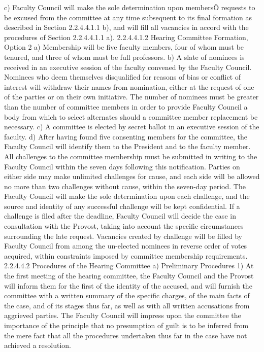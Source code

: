 \documentclass[letterpaper, 11pt]{article}
\begin{document}
	c) Faculty Council will make the sole determination upon membersÕ requests to be excused from the committee at any time subsequent to its final formation as described in Section 2.2.4.4.1.1 b), and will fill all vacancies in accord with the procedures of Section 2.2.4.4.1.1 a).
	2.2.4.4.1.2 Hearing Committee Formation, Option 2
	a) Membership will be five faculty members, four of whom must be tenured, and three of whom must be full professors.
	b) A slate of nominees is received in an executive session of the faculty convened by the Faculty Council.  Nominees who deem themselves disqualified for reasons of bias or conflict of interest will withdraw their names from nomination, either at the request of one of the parties or on their own initiative.  The number of nominees must be greater than the number of committee members in order to provide Faculty Council a body from which to select alternates should a committee member replacement be necessary.
	c) A committee is elected by secret ballot in an executive session of the faculty.
	d) After having found five consenting members for the committee, the Faculty Council will identify them to the President and to the faculty member.  All challenges to the committee membership must be submitted in writing to the Faculty Council within the seven days following this notification.  Parties on either side may make unlimited challenges for cause, and each side will be allowed no more than two challenges without cause, within the seven-day period.  The Faculty Council will make the sole determination upon each challenge, and the source and identity of any successful challenge will be kept confidential.  If a challenge is filed after the deadline, Faculty Council will decide the case in consultation with the Provost, taking into account the specific circumstances surrounding the late request.  Vacancies created by challenge will be filled by Faculty Council from among the un-elected nominees in reverse order of votes acquired, within constraints imposed by committee membership requirements.
	2.2.4.4.2 Procedures of the Hearing Committee
	a) Preliminary Procedures
	1) At the first meeting of the hearing committee, the Faculty Council and the Provost will inform them for the first of the identity of the accused, and will furnish the committee with a written summary of the specific charges, of the main facts of the case, and of its stages thus far, as well as with all written accusations from aggrieved parties. The Faculty Council will impress upon the committee the importance of the principle that no presumption of guilt is to be inferred from the mere fact that all the procedures undertaken thus far in the case have not achieved a resolution.
\end{document}
